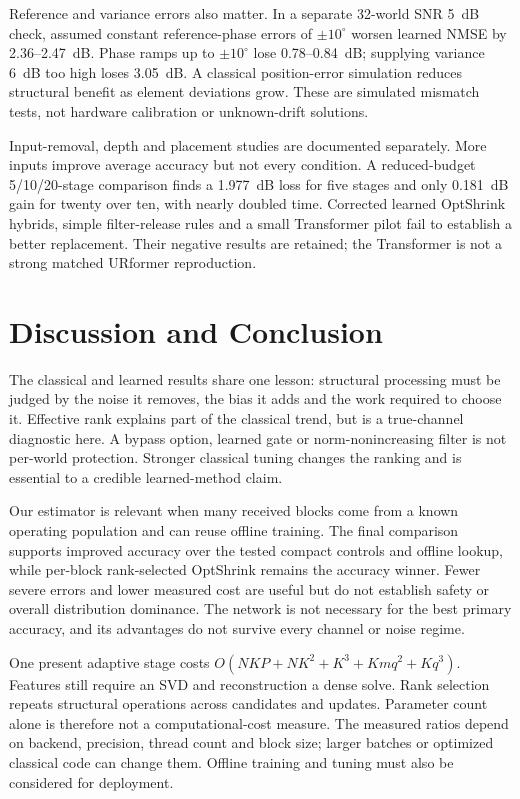 \documentclass[10pt,journal,letterpaper]{IEEEtran}
\begin{document}
Reference and variance errors also matter. In a separate 32-world SNR 5~dB check, assumed constant reference-phase errors of $\pm10^\circ$ worsen learned NMSE by 2.36--2.47~dB. Phase ramps up to $\pm10^\circ$ lose 0.78--0.84~dB; supplying variance 6~dB too high loses 3.05~dB. A classical position-error simulation reduces structural benefit as element deviations grow. These are simulated mismatch tests, not hardware calibration or unknown-drift solutions.

Input-removal, depth and placement studies are documented separately. More inputs improve average accuracy but not every condition. A reduced-budget 5/10/20-stage comparison finds a 1.977~dB loss for five stages and only 0.181~dB gain for twenty over ten, with nearly doubled time. Corrected learned OptShrink hybrids, simple filter-release rules and a small Transformer pilot fail to establish a better replacement. Their negative results are retained; the Transformer is not a strong matched URformer reproduction.

\section{Discussion and Conclusion}
The classical and learned results share one lesson: structural processing must be judged by the noise it removes, the bias it adds and the work required to choose it. Effective rank explains part of the classical trend, but is a true-channel diagnostic here. A bypass option, learned gate or norm-nonincreasing filter is not per-world protection. Stronger classical tuning changes the ranking and is essential to a credible learned-method claim.

Our estimator is relevant when many received blocks come from a known operating population and can reuse offline training. The final comparison supports improved accuracy over the tested compact controls and offline lookup, while per-block rank-selected OptShrink remains the accuracy winner. Fewer severe errors and lower measured cost are useful but do not establish safety or overall distribution dominance. The network is not necessary for the best primary accuracy, and its advantages do not survive every channel or noise regime.

One present adaptive stage costs $O(NKP+NK^2+K^3+Kmq^2+Kq^3)$. Features still require an SVD and reconstruction a dense solve. Rank selection repeats structural operations across candidates and updates. Parameter count alone is therefore not a computational-cost measure. The measured ratios depend on backend, precision, thread count and block size; larger batches or optimized classical code can change them. Offline training and tuning must also be considered for deployment.
\end{document}

